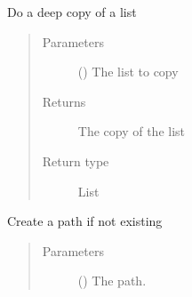 \documentclass[a4paper,10pt,english]{sphinxmanual}
\begin{document}

\begin{fulllineitems}
\label{\detokenize{commands/apidoc/src:src.__init__.config_has_application}}
\end{fulllineitems}


\begin{fulllineitems}
\label{\detokenize{commands/apidoc/src:src.__init__.deepcopy_list}}
Do a deep copy of a list
\begin{quote}\begin{description}
\item[{Parameters}] \leavevmode
{} () \textendash{} The list to copy

\item[{Returns}] \leavevmode
The copy of the list

\item[{Return type}] \leavevmode
List

\end{description}\end{quote}

\end{fulllineitems}


\begin{fulllineitems}
\label{\detokenize{commands/apidoc/src:src.__init__.ensure_path_exists}}
Create a path if not existing
\begin{quote}\begin{description}
\item[{Parameters}] \leavevmode
{} () \textendash{} The path.

\end{description}\end{quote}

\end{fulllineitems}
\end{document}
